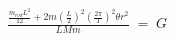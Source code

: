 \documentclass[preview]{standalone}
\begin{document}
\begin{align*}
\frac{\frac{m_{rod}L^2}{12}+2m(\frac{L}{2})^2(\frac{2\pi}{T})^2\theta r^2}{LMm} \;=\; G
\end{align*}
\end{document}

